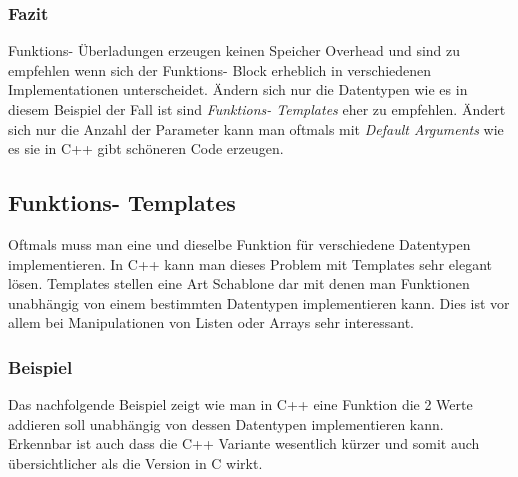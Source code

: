 \documentclass[MES,Master,ngerman]{twbook}%
\begin{document}
\subsubsection{Fazit}
Funktions- Überladungen erzeugen keinen Speicher Overhead und sind zu empfehlen wenn sich der Funktions- Block erheblich in verschiedenen Implementationen unterscheidet. Ändern sich nur die Datentypen wie es in diesem Beispiel der Fall ist sind \textit{Funktions- Templates} eher zu empfehlen. Ändert sich nur die Anzahl der Parameter kann man oftmals mit \textit{Default Arguments} wie es sie in C++ gibt schöneren Code erzeugen.

\newpage
\subsection{Funktions- Templates}
Oftmals muss man eine und dieselbe Funktion für verschiedene Datentypen implementieren. In C++ kann man dieses Problem mit Templates sehr elegant lösen. Templates stellen eine Art Schablone dar mit denen man Funktionen unabhängig von einem bestimmten Datentypen implementieren kann. Dies ist vor allem bei Manipulationen von Listen oder Arrays sehr interessant.
\subsubsection{Beispiel}
Das nachfolgende Beispiel zeigt wie man in C++ eine Funktion die 2 Werte addieren soll unabhängig von dessen Datentypen implementieren kann. Erkennbar ist auch dass die C++ Variante wesentlich kürzer und somit auch übersichtlicher als die Version in C wirkt.
\begin{figure}[!htb]
	\begin{subfigure}[b]{0.5\textwidth}
		
		\label{fig:3}
	\end{subfigure}
	\begin{subfigure}[b]{0.5\textwidth}
		
		\label{fig:4}
	\end{subfigure}
\end{figure}
\end{document}
